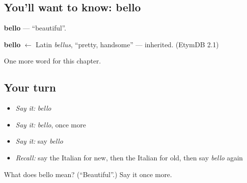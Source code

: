\subsection*{You'll want to know: bello}
\textbf{bello} — \textquotedblleft{}beautiful\textquotedblright{}.

\begin{cousinweb}
\textbf{bello} $\leftarrow$ Latin \emph{bellus}, \textquotedblleft{}pretty, handsome\textquotedblright{} — inherited. (EtymDB 2.1)
\end{cousinweb}

\begin{grammarlens}[title={What you've built}]
One more word for this chapter.
\end{grammarlens}

\subsection*{Your turn}
\begin{itemize}
\raggedright
  \item \emph{Say it:} \emph{bello}
  \item \emph{Say it:} \emph{bello}, once more
  \item \emph{Say it:} say \emph{bello}
  \item \emph{Recall:} say the Italian for new, then the Italian for old, then say \emph{bello} again
\end{itemize}

\begin{tcolorbox}[breakable,colback=teal!4,colframe=teal!35!black,title={Before you move on}]
What does bello mean? (\textquotedblleft{}Beautiful\textquotedblright{}.) Say it once more.
\end{tcolorbox}
